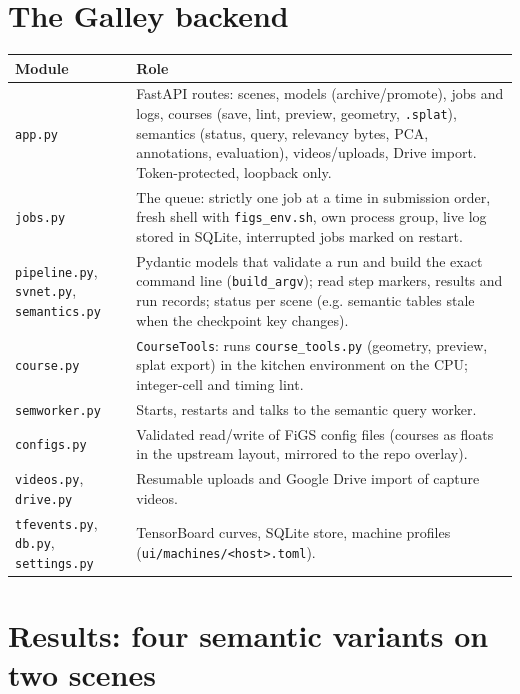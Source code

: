 \documentclass[11pt,a4paper]{article}
\newcommand{\code}[1]{\texttt{#1}}
\begin{document}
\section{The Galley backend}
\begin{tabularx}{\linewidth}{@{}lL@{}}
\toprule
Module & Role \\
\midrule
\code{app.py} & FastAPI routes: scenes, models (archive/promote), jobs and logs, courses (save, lint, preview, geometry, \code{.splat}), semantics (status, query, relevancy bytes, PCA, annotations, evaluation), videos/uploads, Drive import. Token-protected, loopback only. \\
\code{jobs.py} & The queue: strictly one job at a time in submission order, fresh shell with \code{figs\_env.sh}, own process group, live log stored in SQLite, interrupted jobs marked on restart. \\
\code{pipeline.py}, \code{svnet.py}, \code{semantics.py} & Pydantic models that validate a run and build the exact command line (\code{build\_argv}); read step markers, results and run records; status per scene (e.g. semantic tables stale when the checkpoint key changes). \\
\code{course.py} & \code{CourseTools}: runs \code{course\_tools.py} (geometry, preview, splat export) in the kitchen environment on the CPU; integer-cell and timing lint. \\
\code{semworker.py} & Starts, restarts and talks to the semantic query worker. \\
\code{configs.py} & Validated read/write of FiGS config files (courses as floats in the upstream layout, mirrored to the repo overlay). \\
\code{videos.py}, \code{drive.py} & Resumable uploads and Google Drive import of capture videos. \\
\code{tfevents.py}, \code{db.py}, \code{settings.py} & TensorBoard curves, SQLite store, machine profiles (\code{ui/machines/<host>.toml}). \\
\bottomrule
\end{tabularx}

\section{Results: four semantic variants on two scenes}
\end{document}
